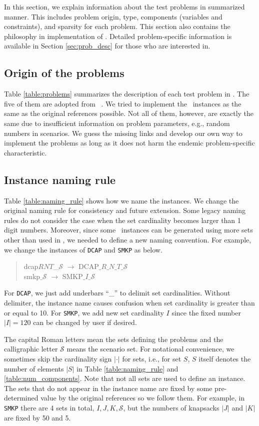 In this section, we explain information about the test problems in summarized manner. This includes problem origin, type, components (variables and constraints), and sparsity for each problem. This section also contains the philosophy in implementation of \siplibtwo. Detailed problem-specific information is available in Section \ref{sec:prob_desc} for those who are interested in.

\subsection{Origin of the problems}
Table \ref{table:problems} summarizes the description of each test problem in \siplibtwo. The five of them are adopted from \siplib\ \cite{web:SIPLIB1}. We tried to implement the \siplib\ instances as the same as the original references possible. Not all of them, however, are exactly the same due to insufficient information on problem parameters, e.g., random numbers in scenarios. We guess the missing links and develop our own way to implement the problems as long as it does not harm the endemic problem-specific characteristic. 


\subsection{Instance naming rule}
Table \ref{table:naming_rule} shows how we name the instances. We change the original naming rule for consistency and future extension. Some legacy naming rules do not consider the case when the set cardinality becomes larger than 1 digit numbers. Moreover, since some \siplibtwo\ instances can be generated using more sets other than used in \siplib, we needed to define a new naming convention. For example, we change the instances of \texttt{DCAP} and \texttt{SMKP} as below.
\begin{quote}
	\centering dcap$RNT$\_$\mathcal{S}$ $\longrightarrow$ DCAP$\_R\_N\_T\_\mathcal{S}$\\
	smkp$\_\mathcal{S}$ $\longrightarrow$ SMKP$\_I\_\mathcal{S}$
\end{quote}
For \texttt{DCAP}, we just add underbars ``\_'' to delimit set cardinalities. Without delimiter, the instance name causes confusion when set cardinality is greater than or equal to 10. For \texttt{SMKP}, we add new set cardinality $I$ since the fixed number $|I|=120$ can be changed by user if desired.

The capital Roman letters mean the sets defining the problems and the calligraphic letter $\mathcal{S}$ means the scenario set. For notational convenience, we sometimes skip the cardinality sign $|\cdot|$ for sets, i.e., for set $S$, $S$ itself denotes the number of elements $|S|$ in Table \ref{table:naming_rule} and \ref{table:num_components}. Note that not all sets are used to define an instance. The sets that do not appear in the instance name are fixed by some pre-determined value by the original references so we follow them. For example, in \texttt{SMKP} there are 4 sets in total, $I,J,K,\mathcal{S}$, but the numbers of knapsacks $|J|$ and $|K|$ are fixed by 50 and 5.


